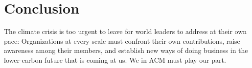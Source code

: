 \documentclass[12pt]{article}
\newcommand{\bcp}[1]{\ifdraft{\bf [bcp: #1]}\fi}
\newcommand{\SECTION}{\section*}
\begin{document}




\SECTION{Conclusion}


The climate crisis is too urgent to leave for
world leaders to address at their own pace: Organizations at every scale
must confront their own contributions, raise awareness among their members,
and establish new ways of doing business in the lower-carbon future that is
coming at us.  We in ACM must play our part.







\end{document}
